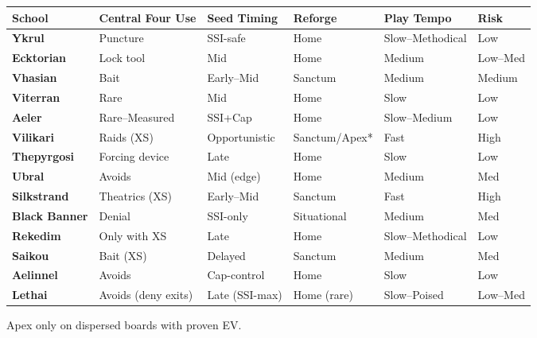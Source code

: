 \documentclass[11pt]{article}
\renewcommand{\arraystretch}{1.15}
\begin{document}
\begingroup
\small
\setlength{\tabcolsep}{4pt}
\renewcommand{\arraystretch}{1.15}
\noindent\begin{tabularx}{\linewidth}{@{}>{\bfseries}l *{5}{>{\raggedright\arraybackslash}X}@{}}
\toprule
School & Central Four Use & Seed Timing & Reforge & Play Tempo & Risk \\
\midrule
Ykrul      & Puncture         & SSI-safe         & Home            & Slow--Methodical & Low \\
Ecktorian  & Lock tool        & Mid              & Home            & Medium           & Low--Med \\
Vhasian    & Bait             & Early--Mid       & Sanctum         & Medium           & Medium \\
Viterran   & Rare             & Mid              & Home            & Slow             & Low \\
Aeler      & Rare--Measured   & SSI+Cap          & Home            & Slow--Medium     & Low \\
Vilikari   & Raids (XS)       & Opportunistic    & Sanctum/Apex*   & Fast             & High \\
Thepyrgosi & Forcing device   & Late             & Home            & Slow             & Low \\
Ubral      & Avoids           & Mid (edge)       & Home            & Medium           & Med \\
Silkstrand & Theatrics (XS)   & Early--Mid       & Sanctum         & Fast             & High \\
Black Banner & Denial         & SSI-only         & Situational     & Medium           & Med \\
Rekedim    & Only with XS     & Late             & Home            & Slow--Methodical & Low \\
Saikou     & Bait (XS)        & Delayed          & Sanctum         & Medium           & Med \\
Aelinnel   & Avoids           & Cap-control      & Home            & Slow             & Low \\
Lethai     & Avoids (deny exits) & Late (SSI-max) & Home (rare)     & Slow--Poised     & Low--Med \\
\bottomrule
\end{tabularx}

\vspace{2pt}
\noindent\footnotesize * Apex only on dispersed boards with proven EV.\par
\endgroup
\end{document}
